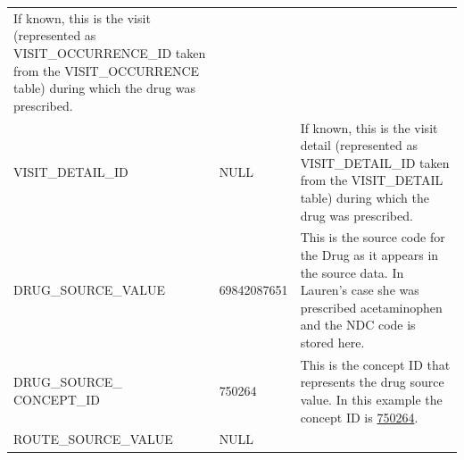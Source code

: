 \documentclass[]{book}
\begin{document}
\begin{longtable}[]{@{}lll@{}}
\begin{minipage}[t]{0.47\columnwidth}
If known, this is the visit (represented as VISIT\_OCCURRENCE\_ID taken
from the VISIT\_OCCURRENCE table) during which the drug was
prescribed.\strut
\end{minipage}\tabularnewline
\begin{minipage}[t]{0.30\columnwidth}\raggedright\strut
VISIT\_DETAIL\_ID\strut
\end{minipage} & \begin{minipage}[t]{0.14\columnwidth}\raggedright\strut
NULL\strut
\end{minipage} & \begin{minipage}[t]{0.47\columnwidth}\raggedright\strut
If known, this is the visit detail (represented as VISIT\_DETAIL\_ID
taken from the VISIT\_DETAIL table) during which the drug was
prescribed.\strut
\end{minipage}\tabularnewline
\begin{minipage}[t]{0.30\columnwidth}\raggedright\strut
DRUG\_SOURCE\_VALUE\strut
\end{minipage} & \begin{minipage}[t]{0.14\columnwidth}\raggedright\strut
69842087651\strut
\end{minipage} & \begin{minipage}[t]{0.47\columnwidth}\raggedright\strut
This is the source code for the Drug as it appears in the source data.
In Lauren's case she was prescribed acetaminophen and the NDC code is
stored here.\strut
\end{minipage}\tabularnewline
\begin{minipage}[t]{0.30\columnwidth}\raggedright\strut
DRUG\_SOURCE\_ CONCEPT\_ID\strut
\end{minipage} & \begin{minipage}[t]{0.14\columnwidth}\raggedright\strut
750264\strut
\end{minipage} & \begin{minipage}[t]{0.47\columnwidth}\raggedright\strut
This is the concept ID that represents the drug source value. In this
example the concept ID is
\href{http://athena.ohdsi.org/search-terms/terms/750264}{750264}.\strut
\end{minipage}\tabularnewline
\begin{minipage}[t]{0.30\columnwidth}\raggedright\strut
ROUTE\_SOURCE\_VALUE\strut
\end{minipage} & \begin{minipage}[t]{0.14\columnwidth}\raggedright\strut
NULL\strut
\end{minipage} & \begin{minipage}[t]{0.47\columnwidth}\raggedright\strut

\end{minipage}
\end{longtable}
\end{document}
